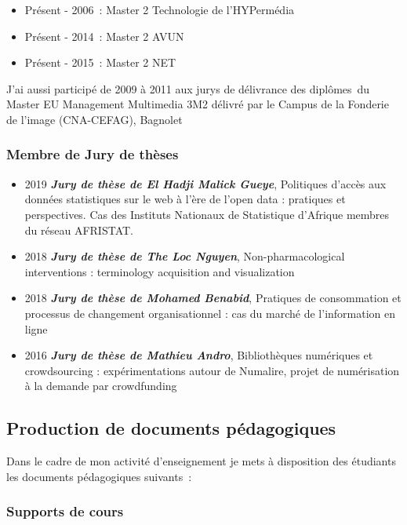 \documentclass[
  a4paper,
  DIV=11,
  numbers=noendperiod]{scrreprt}
\begin{document}
\begin{itemize}
\item
  Présent - 2006~: Master 2 Technologie de l'HYPermédia
\item
  Présent - 2014~: Master 2 AVUN
\item
  Présent - 2015~: Master 2 NET
\end{itemize}

J'ai aussi participé de 2009 à 2011 aux jurys de délivrance des
diplômes~du Master EU Management Multimedia 3M2 délivré par le Campus de
la Fonderie de l'image (CNA-CEFAG), Bagnolet~

\subsubsection{\texorpdfstring{\textbf{Membre de Jury de
thèses}}{Membre de Jury de thèses}}\label{sec-juryThese}

\begin{itemize}
\item
  2019 \textbf{\emph{Jury de thèse de El Hadji Malick Gueye}},
  Politiques d'accès aux données statistiques sur le web à l'ère de
  l'open data : pratiques et perspectives. Cas des Instituts Nationaux
  de Statistique d'Afrique membres du réseau AFRISTAT.
\item
  2018 \textbf{\emph{Jury de thèse de The Loc Nguyen}},
  Non-pharmacological interventions : terminology acquisition and
  visualization
\item
  2018 \textbf{\emph{Jury de thèse de Mohamed Benabid}}, Pratiques de
  consommation et processus de changement organisationnel : cas du
  marché de l'information en ligne
\item
  2016 \textbf{\emph{Jury de thèse de Mathieu Andro}}, Bibliothèques
  numériques et crowdsourcing : expérimentations autour de Numalire,
  projet de numérisation à la demande par crowdfunding
\end{itemize}

\subsection{Production de documents
pédagogiques~}\label{production-de-documents-puxe9dagogiques}

Dans le cadre de mon activité d'enseignement je mets à disposition des
étudiants les documents pédagogiques suivants~:

\subsubsection{Supports de cours}\label{supports-de-cours}
\end{document}
